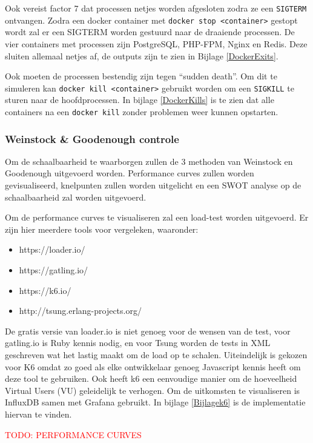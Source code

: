 Ook vereist factor 7 dat processen netjes worden afgesloten zodra ze een \texttt{SIGTERM} ontvangen. Zodra een docker container met \texttt{docker stop <container>} gestopt wordt zal er een SIGTERM worden gestuurd naar de draaiende processen. De vier containers met processen zijn PostgreSQL, PHP-FPM, Nginx en Redis. Deze sluiten allemaal netjes af, de outputs zijn te zien in Bijlage \ref{DockerExits}.

Ook moeten de processen bestendig zijn tegen \enquote{sudden death}. Om dit te simuleren kan \texttt{docker kill <container>} gebruikt worden om een \texttt{SIGKILL} te sturen naar de hoofdprocessen. In bijlage \ref{DockerKills} is te zien dat alle containers na een \texttt{docker kill} zonder problemen weer kunnen opstarten.

\subsubsection{Weinstock \& Goodenough controle}
Om de schaalbaarheid te waarborgen zullen de 3 methoden van Weinstock en Goodenough \parencite{OnSystemScalability} uitgevoerd worden. Performance curves zullen worden gevisualiseerd, knelpunten zullen worden uitgelicht en een SWOT analyse op de schaalbaarheid zal worden uitgevoerd.

Om de performance curves te visualiseren zal een load-test worden uitgevoerd. Er zijn hier meerdere tools voor vergeleken, waaronder:
\begin{itemize}
	\item https://loader.io/
	\item https://gatling.io/
	\item https://k6.io/
	\item http://tsung.erlang-projects.org/
\end{itemize}

De gratis versie van loader.io is niet genoeg voor de wensen van de test, voor gatling.io is Ruby kennis nodig, en voor Tsung worden de tests in XML geschreven wat het lastig maakt om de load op te schalen. Uiteindelijk is gekozen voor K6 omdat zo goed als elke ontwikkelaar genoeg Javascript kennis heeft om deze tool te gebruiken. Ook heeft k6 een eenvoudige manier om de hoeveelheid Virtual Users (VU) geleidelijk te verhogen. Om de uitkomsten te visualiseren is InfluxDB samen met Grafana gebruikt. In bijlage \ref{Bijlagek6} is de implementatie hiervan te vinden.

\textcolor{red}{TODO: PERFORMANCE CURVES} %


